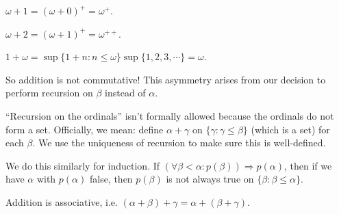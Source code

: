 \documentclass[a4paper]{article}
\begin{document}
\begin{eg}
  $\omega + 1 = (\omega + 0)^+ = \omega^+$.

  $\omega + 2 = (\omega + 1)^+ = \omega^{++}$.

  $1 + \omega = \sup\{ 1 + n: n \leq \omega\} \sup\{1, 2, 3, \cdots\} = \omega$.
\end{eg}
So addition is not commutative! This asymmetry arises from our decision to perform recursion on $\beta$ instead of $\alpha$.

\note ``Recursion on the ordinals'' isn't formally allowed because the ordinals do not form a set. Officially, we mean: define $\alpha + \gamma$ on $\{\gamma: \gamma \leq \beta\}$ (which is a set) for each $\beta$. We use the uniqueness of recursion to make sure this is well-defined.

We do this similarly for induction. If $(\forall \beta < \alpha: p(\beta)) \Rightarrow  p(\alpha)$, then if we have $\alpha$ with $p(\alpha)$ false, then $p(\beta)$ is not always true on $\{\beta: \beta \leq \alpha\}$.

\begin{prop}
  Addition is associative, i.e. $(\alpha + \beta) + \gamma = \alpha + (\beta + \gamma)$.
\end{prop}
\end{document}
